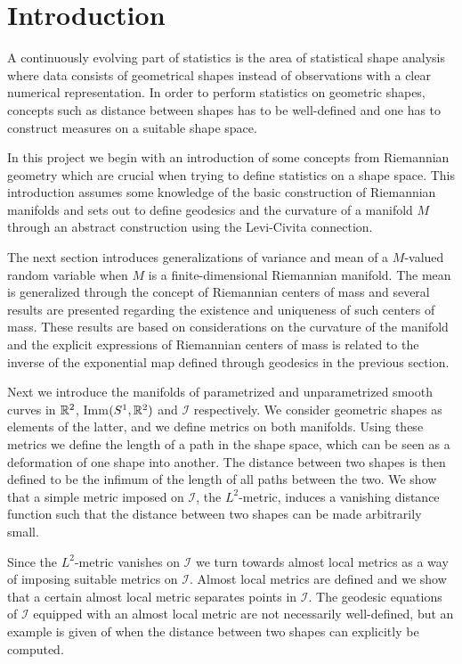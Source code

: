 \section*{Introduction}
\label{sec:introduction}

A continuously evolving part of statistics is the area of statistical shape analysis where data consists of geometrical shapes instead of observations with a clear numerical representation. In order to perform statistics on geometric shapes, concepts such as distance between shapes has to be well-defined and one has to construct measures on a suitable shape space.

In this project we begin with an introduction of some concepts from Riemannian geometry which are crucial when trying to define statistics on a shape space. This introduction assumes some knowledge of the basic construction of Riemannian manifolds and sets out to define geodesics and the curvature of a manifold $M$ through an abstract construction using the Levi-Civita connection.

The next section introduces generalizations of variance and mean of a $M$-valued random variable when $M$ is a finite-dimensional Riemannian manifold. The mean is generalized through the concept of Riemannian centers of mass and several results are presented regarding the existence and uniqueness of such centers of mass. These results are based on considerations on the curvature of the manifold and the explicit expressions of Riemannian centers of mass is related to the inverse of the exponential map defined through geodesics in the previous section.

Next we introduce the manifolds of parametrized and unparametrized smooth curves in $\mathbb{R}^2$, Imm$(S^1, \mathbb{R}^2)$ and $\mathcal{I}$ respectively. We consider geometric shapes as elements of the latter, and we define metrics on both manifolds. Using these metrics we define the length of a path in the shape space, which can be seen as a deformation of one shape into another. The distance between two shapes is then defined to be the infimum of the length of all paths between the two. We show that a simple metric imposed on $\mathcal{I}$, the $L^2$-metric, induces a vanishing distance function such that the distance between two shapes can be made arbitrarily small.

Since the $L^2$-metric vanishes on $\mathcal{I}$ we turn towards almost local metrics as a way of imposing suitable metrics on $\mathcal{I}$. Almost local metrics are defined and we show that a certain almost local metric separates points in $\mathcal{I}$. The geodesic equations of $\mathcal{I}$ equipped with an almost local metric are not necessarily well-defined, but an example is given of when the distance between two shapes can explicitly be computed.

